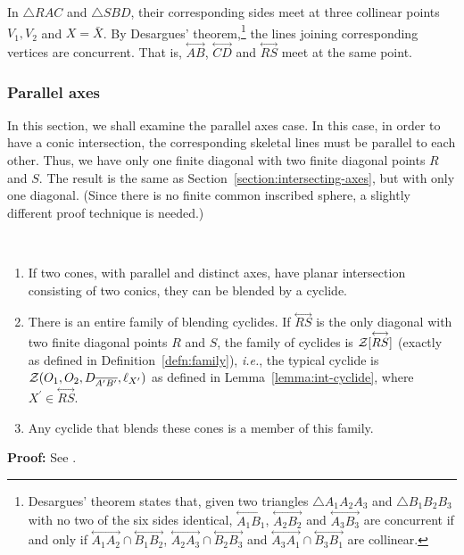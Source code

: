      In $\bigtriangleup RAC$ and $\bigtriangleup SBD$, their corresponding 
sides meet at three collinear points $V_1, V_2$ and $X=\bar{X}$.  By
Desargues' theorem,\footnote{Desargues' theorem \cite{johnson:1929} states 
	that, given two triangles $\bigtriangleup A_1A_2A_3$ and 
	$\bigtriangleup B_1B_2B_3$ with no two of the six sides identical,
	$\stackrel{\longleftrightarrow}{A_1B_1}$,
	$\stackrel{\longleftrightarrow}{A_2B_2}$ and
	$\stackrel{\longleftrightarrow}{A_3B_3}$ are concurrent if and only if
	$\stackrel{\longleftrightarrow}{A_1A_2}\cap\stackrel{\longleftrightarrow}{B_1B_2}$,
	$\stackrel{\longleftrightarrow}{A_2A_3}\cap\stackrel{\longleftrightarrow}{B_2B_3}$ and
	$\stackrel{\longleftrightarrow}{A_3A_1}\cap\stackrel{\longleftrightarrow}{B_3B_1}$
	are collinear.} 
the lines joining corresponding vertices are concurrent.
That is, $\stackrel{\longleftrightarrow}{AB}$,
$\stackrel{\longleftrightarrow}{CD}$ and $\stackrel{\longleftrightarrow}{RS}$
meet at the same point.
\QED

\subsubsection{Parallel axes}
\label{section:cyc:parallel-axes}

     In this section, we shall examine the parallel axes case.  
In this case, in order to have a conic intersection, the 
corresponding skeletal lines must be parallel to each other. 
Thus, we have only one finite diagonal with two finite diagonal points $R$ 
and $S$.  
The result is the same as Section~\ref{section:intersecting-axes},
but with only one diagonal.
(Since there is no finite common inscribed sphere, a slightly different proof
technique is needed.)

\begin{lemma}
\label{lemma:para-cyclide}\ 
\begin{enumerate}
\item
     If two cones, with parallel and distinct axes,
have planar intersection consisting of two conics, 
they can be blended by a cyclide.
\item
     There is an entire family of blending cyclides.
If $\stackrel{\longleftrightarrow}{RS}$ is the only diagonal with two finite
diagonal points $R$ and $S$, the family of cyclides is 
${\cal Z}[\stackrel{\longleftrightarrow}{RS}]$ (exactly as defined in 
Definition~\ref{defn:family}), {\em i.e.}, the typical cyclide is
${\cal Z}(O_1,O_2,D_{\overline{A^\prime B^\prime}},\ell_{X^\prime})$
as defined in Lemma~\ref{lemma:int-cyclide}, where 
$X^\prime \in \stackrel{\longleftrightarrow}{RS}$.
\item
	Any cyclide that blends these cones is a member of this family.
\end{enumerate}
\end{lemma}
{\bf Proof:}  
See \cite[Lemmas~5.15 and 5.16]{shenethesis}.
\QED

